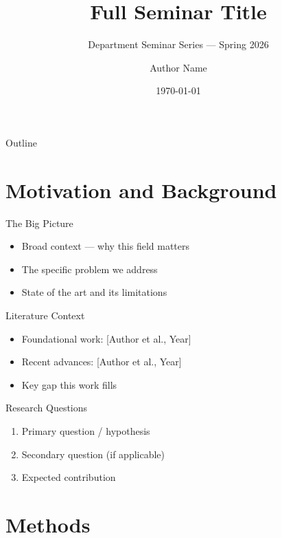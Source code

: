 \documentclass[aspectratio=169,11pt]{beamer}
\title[Short Title]{Full Seminar Title}
\subtitle{Department Seminar Series — Spring 2026}
\author[A.~Author]{Author Name}
\institute{Department of X \\ University of Y}
\date{\today}
\begin{document}
\begin{frame}
  \titlepage
\end{frame}

\begin{frame}{Outline}
  \tableofcontents
\end{frame}

\section{Motivation and Background}

\begin{frame}{The Big Picture}
  \begin{itemize}
    \item Broad context — why this field matters
    \item The specific problem we address
    \item State of the art and its limitations
  \end{itemize}
\end{frame}

\begin{frame}{Literature Context}
  \begin{itemize}
    \item Foundational work: [Author et al., Year]
    \item Recent advances: [Author et al., Year]
    \item Key gap this work fills
  \end{itemize}
\end{frame}

\begin{frame}{Research Questions}
  \begin{enumerate}
    \item Primary question / hypothesis
    \item Secondary question (if applicable)
    \item Expected contribution
  \end{enumerate}
\end{frame}

\section{Methods}
\end{document}
